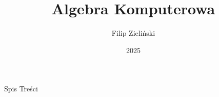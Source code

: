 \documentclass{beamer}
\title{Algebra Komputerowa}
\author{Filip Zieli\'nski}
\date{2025}
\begin{document}
\begin{frame}
\titlepage
\end{frame}
 
\begin{frame}{Spis Treści}
    \tableofcontents
\end{frame}
\end{document}
